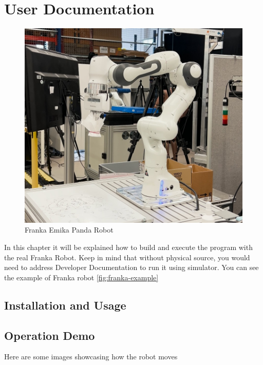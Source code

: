 \chapter{User Documentation}\label{chapter:user}

\begin{figure}[htbp]
    \centering
    \includegraphics[width=0.5\linewidth]{figures/franka-example.png}
    \caption{Franka Emika Panda Robot}
    \label{fig:franka-example}
\end{figure}

In this chapter it will be explained how to build and execute the program with the real Franka Robot. Keep in mind that without physical source, you would need to address Developer Documentation to run it using simulator. You can see the example of Franka robot \autoref{fig:franka-example}


\section{Installation and Usage}


\section{Operation Demo}

Here are some images showcasing how the robot moves

